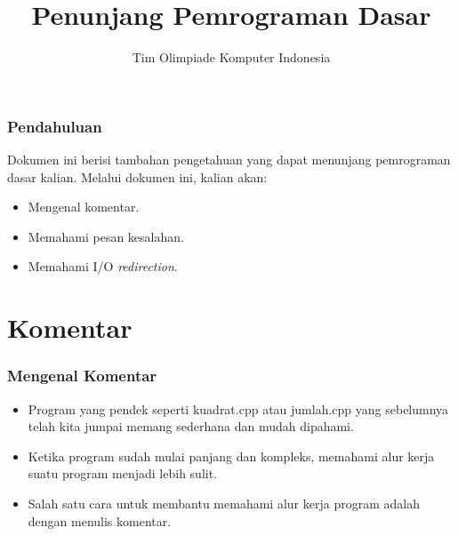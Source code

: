 

\title{Penunjang Pemrograman Dasar}
\author{Tim Olimpiade Komputer Indonesia}
\date{}



\begin{frame}
\titlepage
\end{frame}

\begin{frame}
\frametitle{Pendahuluan}
Dokumen ini berisi tambahan pengetahuan yang dapat menunjang pemrograman dasar kalian.
\vfill
Melalui dokumen ini, kalian akan:
\begin{itemize}
  \item Mengenal komentar.
  \item Memahami pesan kesalahan.
  \item Memahami I/O \textit{redirection}.
\end{itemize}
\end{frame}

\section{Komentar}
\frame{\sectionpage}

\begin{frame}
\frametitle{Mengenal Komentar}
\begin{itemize}
  \item Program yang pendek seperti kuadrat.cpp atau jumlah.cpp yang sebelumnya telah kita jumpai memang sederhana dan mudah dipahami.
  \item Ketika program sudah mulai panjang dan kompleks, memahami alur kerja suatu program menjadi lebih sulit.
  \item Salah satu cara untuk membantu memahami alur kerja program adalah dengan menulis komentar.
\end{itemize}
\end{frame}

